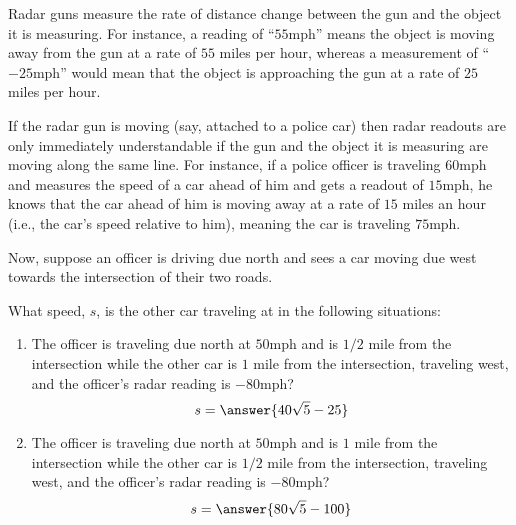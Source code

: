 \documentclass{ximera}
\author{Gregory Hartman \and Matthew Carr}
\begin{document}
\begin{exercise}



Radar guns measure the rate of distance change between the gun and the object it is measuring. For instance, a reading of ``$55$mph'' means the object is moving away from the gun at a rate of $55$ miles per hour, whereas a measurement of ``$-25$mph'' would mean that the object is approaching the gun at a rate of $25$ miles per hour.

If the radar gun is moving (say, attached to a police car) then radar readouts are only immediately understandable if the gun and the object it is measuring are moving along the same line. For instance, if a police officer is traveling $60$mph and measures the speed of a car ahead of him and gets a readout of $15$mph, he knows that the car ahead of him is moving away at a rate of $15$ miles an hour (i.e., the car's speed relative to him), meaning the car is traveling $75$mph.


Now, suppose an officer is driving due north and sees a car moving due west towards the intersection of their two roads.

What speed, $s$, is the other car traveling at in the following situations:
\begin{enumerate}
\item		The officer is traveling due north at $50$mph and is $1/2$ mile from the intersection while the other car is $1$ mile from the intersection, traveling west, and the officer's radar reading is $-80$mph? \[s = \answer{40\sqrt{5}-25}\]
\item		The officer is traveling due north at $50$mph and is $1$ mile from the intersection while the other car is $1/2$ mile from the intersection, traveling west, and the officer's radar reading is $-80$mph? \[s = \answer{80\sqrt{5}-100}\]
\end{enumerate}


\end{exercise}
\end{document}
